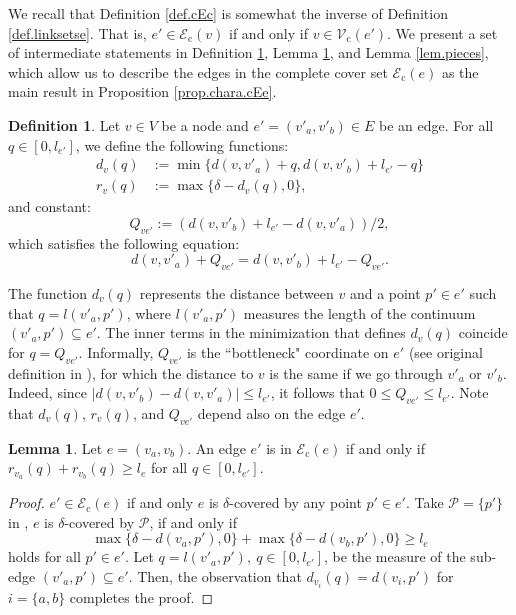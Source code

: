 \documentclass[review]{elsarticle}
\newcommand{\cE}{{\mathcal E}}
\newcommand{\cP}{{\mathcal P}}
\newcommand{\cV}{{\mathcal V}}
\newcommand{\dlt}{{\delta}}
\theoremstyle{definition}
\newtheorem{definition}{Definition}[section]
\newtheorem{lemma}{Lemma}[section]
\begin{document}
We recall that Definition \ref{def.cEc} is somewhat the inverse of Definition \ref{def.linksetse}. That is,  $e'\in \cE_{\mathrm{c}}(v)$ if and only if $v \in \cV_{\mathrm{c}}(e')$. We present a set of intermediate statements in Definition \ref{def.function}, Lemma \ref{lem.covercE}, and Lemma  \ref{lem.pieces}, which allow us to describe the edges in the complete cover set $\cE_{\mathrm{c}}(e)$ as the main result in Proposition \ref{prop.chara.cEe}.

\begin{definition}\label{def.function}
Let $v\in V$ be a node and $e'=(v'_a,v'_b)\in E $ be an edge. For all $q \in [0, l_{e'}]$, we define the following functions:
\begin{align}
	d_v(q) &:= \min \{d(v,v'_a)+q, d(v,v'_b)+l_{e'}-q\} \nonumber\\
	r_v(q) &:= %
	\max\{\dlt -  d_v(q),0\}, \nonumber
\end{align}
and constant:
$$Q_{ve'}:=(d(v,v'_b)+l_{e'} - d(v,v'_a))/2,$$  which satisfies the following equation:
$$d(v,v'_a)+Q_{ve'}=  d(v,v'_b)+l_{e'}-Q_{ve'}.$$
\end{definition}
The function $d_v(q)$ represents the distance between $v$ and a point $p'\in e'$ such that $q=l(v'_a,p')$, where $l(v'_a,p')$ measures the length of the continuum $(v'_a,p')\subseteq e'$.
The inner terms in the minimization that defines $ d_v(q)$ coincide for $q=Q_{ve'}$. Informally, $Q_{ve'}$ is the ``bottleneck" coordinate on $e'$ (see original definition in \cite{obnoxious}), for which the distance to $v$ is the same if we go through $v'_a$ or $v'_b$. Indeed, since $|d(v,v'_b) - d(v,v'_a)| \le l_{e'}$, it follows that $0 \le Q_{ve'} \le l_{e'}$.
Note that $d_v(q)$,  $r_v(q)$, and $Q_{ve'}$ depend also on the edge $e'$. \begin{comment} the associated edge $e'$ will be always clear from the context, and we avoid including it in our notation for the sake of readability. \end{comment}

\begin{lemma} \label{lem.covercE}
Let $e=(v_a,v_b)$. An edge $e'$ is in $\cE_{\mathrm{c}}(e)$ if and only if $ r_{v_a}(q)+r_{v_b}(q)\geq l_e$ for all $q\in [0,l_{e'}]$.
\end{lemma}
\begin{proof}
$e' \in \cE_{\mathrm{c}}(e)$ if and only $e$ is $\dlt$-covered by any point $p' \in e'$.
Take $\cP = \{p'\}$ in , $e$ is $\dlt$-covered by $\cP$, if and only if
 \begin{equation*}
 \max\{\dlt -  d(v_a,p'),0\} +  \max\{\dlt -  d(v_b,p'),0\} \geq l_e
\end{equation*}
holds for all $p'\in e'$. Let $q=l(v'_a,p'),\: q \in [0, l_{e'}]$, be the measure of the sub-edge $(v'_a,p')\subseteq e'$. Then, the observation that $d_{v_i}(q)=d(v_i,p')$ for $i=\{a,b\}$ completes the proof.
\end{proof}
\end{document}
